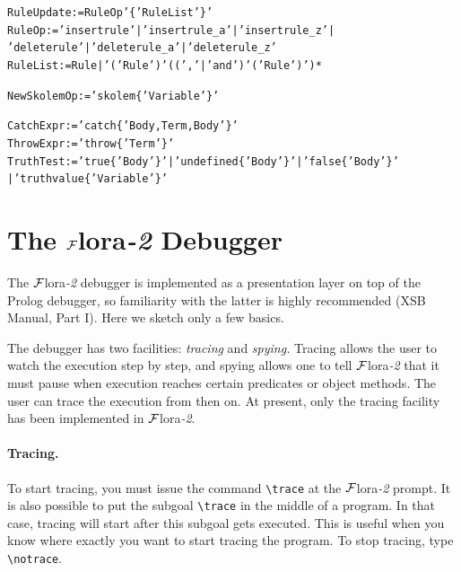\documentclass[11pt]{article}
\newcommand{\FLORA}{{\mbox{\sc ${\cal F}${lora}\rm\emph{-2}}}\xspace}
\newcommand{\FLSYSTEM}{\FLORA}
\newcommand{\bs}{\textbackslash}
\begin{document}
\begin{alltt}
RuleUpdate := RuleOp '\{' RuleList '\}'
RuleOp := 'insertrule' | 'insertrule\_a' | 'insertrule\_z' |
               'deleterule' | 'deleterule\_a' | 'deleterule\_z'
RuleList := Rule | '(' Rule ')'  ( (',' | 'and')  '(' Rule ')' )*

NewSkolemOp := 'skolem\{' Variable '\}'

CatchExpr := 'catch\{' Body, Term, Body '\}'
ThrowExpr := 'throw\{' Term '\}'
TruthTest := 'true\{' Body '\}' | 'undefined\{' Body '\}' | 'false\{' Body '\}'
               | 'truthvalue\{' Variable '\}'
\end{alltt}


\section{The \FLSYSTEM Debugger}\label{sec-debugger}


The \FLSYSTEM debugger is implemented as a presentation layer on top of the Prolog
debugger, so familiarity with the latter is highly recommended (XSB Manual,
Part I). Here we sketch only a few basics.

The debugger has two facilities: \emph{tracing} and \emph{spying.} Tracing
allows the user to watch the execution step by step, and
spying allows one to tell \FLSYSTEM that it must pause when execution reaches
certain predicates or object methods. The user can trace the execution from
then on. At present, only the tracing facility has been implemented in
\FLSYSTEM.

\index{\bs{}trace}
\index{\bs{}notrace}
\paragraph{Tracing.}
To start tracing, you must issue the command {\tt \bs{}trace} at the
\FLSYSTEM prompt. It is also possible to put the subgoal {\tt \bs{}trace} in
the middle of a program. In that case, tracing will start after this
subgoal gets executed. This is useful when you know where exactly you want
to start tracing the program. To stop tracing, type {\tt \bs{}notrace}.
\end{document}

